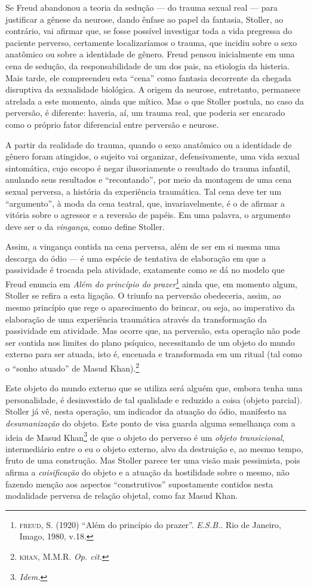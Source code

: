 Se Freud abandonou a teoria da sedução --- do trauma sexual real --- para
justificar a gênese da neurose, dando ênfase ao papel da fantasia, Stoller,
ao contrário, vai afirmar que, se fosse possível investigar toda a vida
pregressa do paciente perverso, certamente localizaríamos o trauma, que
incidiu sobre o sexo anatômico ou sobre a identidade de gênero. Freud
pensou inicialmente em uma cena de sedução, da responsabilidade de um dos
pais, na etiologia da histeria. Mais tarde, ele compreendeu esta “cena”
como fantasia decorrente da chegada disruptiva da sexualidade
biológica. A origem da neurose, entretanto, permanece atrelada a este
momento, ainda que mítico. Mas o que Stoller postula, no caso da perversão,
é diferente: haveria, aí, um trauma real, que poderia ser encarado como o
próprio fator diferencial entre perversão e neurose.

A partir da realidade do trauma, quando o sexo anatômico ou a identidade de
gênero foram atingidos, o sujeito vai organizar, defensivamente, uma vida
sexual sintomática, cujo escopo é negar ilusoriamente o resultado do trauma
infantil, anulando seus resultados e “recontando”, por meio da montagem de
uma cena sexual perversa, a história da experiência traumática. Tal cena
deve ter um “argumento”, à moda da cena teatral, que, invariavelmente, é o
de afirmar a vitória sobre o agressor e a reversão de papéis. Em uma
palavra, o argumento deve ser o da \textit{vingança}, como define Stoller.

Assim, a vingança contida na cena perversa, além de ser em si mesma uma
descarga do ódio --- é uma espécie de tentativa de elaboração em que a
passividade é trocada pela atividade, exatamente como se dá no modelo que
Freud enuncia em \textit{Além do princípio do prazer}\footnote{ \textsc{freud}, S.
(1920) “Além do princípio do prazer”. \textit{E.S.B.}. Rio de Janeiro,
Imago, 1980, v.18.} ainda que, em momento algum, Stoller se refira a esta
ligação. O triunfo na perversão obedeceria, assim, ao mesmo princípio que
rege o aparecimento do brincar, ou seja, ao imperativo da elaboração de uma
experiência traumática através da transformação da passividade em
atividade. Mas ocorre que, na perversão, esta operação não pode ser contida
nos limites do plano psíquico, necessitando de um objeto do mundo externo
para ser atuada, isto é, encenada e transformada em um ritual (tal como o
“sonho atuado” de Masud Khan).\footnote{ \textsc{khan}, M.M.R. \textit{Op. cit.}}

Este objeto do mundo externo que se utiliza será alguém que, embora tenha
uma personalidade, é desinvestido de tal qualidade e reduzido a coisa
(objeto parcial). Stoller já vê, nesta operação, um indicador da atuação do
ódio, manifesto na \textit{desumanização} do objeto. Este ponto de visa
guarda alguma semelhança com a ideia de Masud Khan\footnote{ \textit{Idem.}} de que o
objeto do perverso é um \textit{objeto transicional}, intermediário entre o
eu o objeto externo, alvo da destruição e, ao mesmo tempo, fruto de uma
construção. Mas Stoller parece ter uma visão mais pessimista, pois afirma a
\textit{coisificação} do objeto e a atuação da hostilidade sobre o mesmo,
não fazendo menção aos aspectos “construtivos” supostamente contidos nesta
modalidade perversa de relação objetal, como faz Masud Khan.

